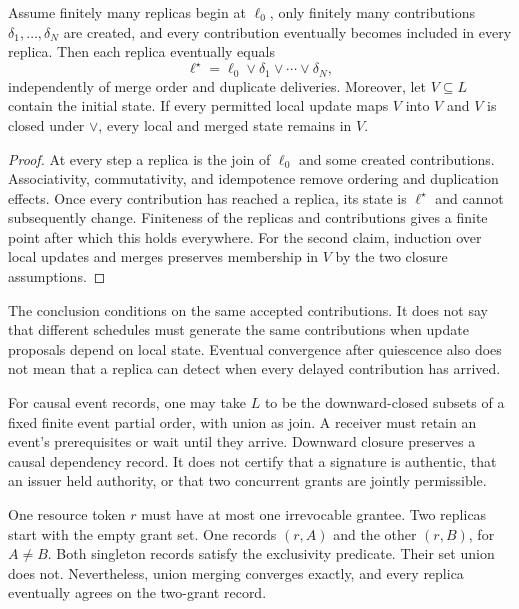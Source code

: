\begin{MSproposition}\label{MS:prop:merge-convergence}
Assume finitely many replicas begin at $\ell_0$, only finitely many contributions $\delta_1,\ldots,\delta_N$ are created, and every contribution eventually becomes included in every replica. Then each replica eventually equals
\[
\ell^\star=\ell_0\vee\delta_1\vee\cdots\vee\delta_N,
\]
independently of merge order and duplicate deliveries. Moreover, let $V\subseteq L$ contain the initial state. If every permitted local update maps $V$ into $V$ and $V$ is closed under $\vee$, every local and merged state remains in $V$.
\end{MSproposition}
\begin{proof}
At every step a replica is the join of $\ell_0$ and some created contributions. Associativity, commutativity, and idempotence remove ordering and duplication effects. Once every contribution has reached a replica, its state is $\ell^\star$ and cannot subsequently change. Finiteness of the replicas and contributions gives a finite point after which this holds everywhere. For the second claim, induction over local updates and merges preserves membership in $V$ by the two closure assumptions.
\end{proof}

The conclusion conditions on the same accepted contributions. It does not say that different schedules must generate the same contributions when update proposals depend on local state. Eventual convergence after quiescence also does not mean that a replica can detect when every delayed contribution has arrived.

For causal event records, one may take $L$ to be the downward-closed subsets of a fixed finite event partial order, with union as join. A receiver must retain an event's prerequisites or wait until they arrive. Downward closure preserves a causal dependency record. It does not certify that a signature is authentic, that an issuer held authority, or that two concurrent grants are jointly permissible.

\begin{MScounterexample}\label{MS:ex:convergent-double-grant}
One resource token $r$ must have at most one irrevocable grantee. Two replicas start with the empty grant set. One records $(r,A)$ and the other $(r,B)$, for $A\ne B$. Both singleton records satisfy the exclusivity predicate. Their set union does not. Nevertheless, union merging converges exactly, and every replica eventually agrees on the two-grant record.
\end{MScounterexample}

